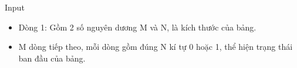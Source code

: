 Input
\begin{itemize}
	\item     Dòng 1: Gồm 2 số nguyên dương M và N, là kích thước của bảng.   
	\item     M dòng tiếp theo, mỗi dòng gồm đúng N kí tự 0 hoặc 1, thể hiện trạng thái ban đầu của bảng.   
\end{itemize}